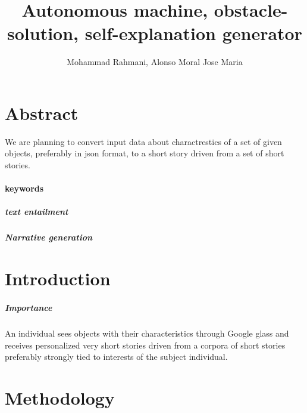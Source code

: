 \documentclass{article}
\begin{document}
	\title{Autonomous machine, obstacle-solution, self-explanation generator}
	\author{Mohammad Rahmani, Alonso Moral Jose Maria}
	\maketitle
		\section{Abstract} 
		We are planning to convert input data about charactrestics of a set of given objects, preferably in json format, to a short story driven from a set of short stories. 
		\paragraph{keywords}
			\subparagraph{text entailment}
			\subparagraph{Narrative generation}
		\section{Introduction}
		\subparagraph{Importance}
		An individual sees objects with their characteristics through Google glass  and receives personalized very short stories driven from a corpora of short stories preferably strongly tied to interests of the subject individual. 
		\section{Methodology}
\end{document}
